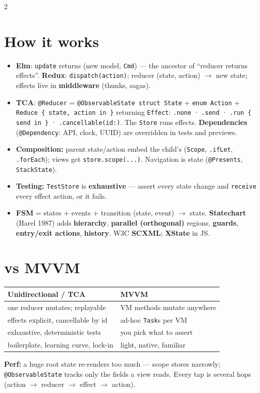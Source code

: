 \documentclass[8pt]{extarticle}
\begin{document}
\begin{multicols}{2}
\raggedright

\section{How it works}
{\raggedright
\begin{itemize}
  \item \textbf{Elm}: \texttt{update} returns (new model, \texttt{Cmd}) — the ancestor
        of ``reducer returns effects''. \textbf{Redux}: \texttt{dispatch(action)};
        reducer (state, action) $\to$ new state; effects live in \textbf{middleware}
        (thunks, sagas).
  \item \textbf{TCA}: \texttt{@Reducer} = \texttt{@ObservableState struct State} +
        \texttt{enum Action} + \texttt{Reduce \{ state, action in \}} returning
        \texttt{Effect}: \texttt{.none} · \texttt{.send} · \texttt{.run \{ send in \}} ·
        \texttt{.cancellable(id:)}. The \texttt{Store} runs effects.
        \textbf{Dependencies} (\texttt{@Dependency}: API, clock, UUID) are overridden in
        tests and previews.
  \item \textbf{Composition:} parent state/action embed the child's
        (\texttt{Scope}, \texttt{.ifLet}, \texttt{.forEach}); views get
        \texttt{store.scope(...)}. Navigation is state (\texttt{@Presents},
        \texttt{StackState}).
  \item \textbf{Testing:} \texttt{TestStore} is \textbf{exhaustive} — assert every state
        change and \texttt{receive} every effect action, or it fails.
  \item \textbf{FSM} = states + events + transition (state, event) $\to$ state.
        \textbf{Statechart} (Harel 1987) adds \textbf{hierarchy}, \textbf{parallel
        (orthogonal)} regions, \textbf{guards}, \textbf{entry/exit actions},
        \textbf{history}. W3C \textbf{SCXML}; \textbf{XState} in JS.
\end{itemize}\par}

\section{vs MVVM}
{\footnotesize
\begin{tabular}{@{}>{\raggedright\arraybackslash}p{36mm}>{\raggedright\arraybackslash}p{38mm}@{}}
\toprule
\textbf{Unidirectional / TCA} & \textbf{MVVM} \\
\midrule
one reducer mutates; replayable & VM methods mutate anywhere \\
effects explicit, cancellable by id & ad-hoc \texttt{Task}s per VM \\
exhaustive, deterministic tests & you pick what to assert \\
boilerplate, learning curve, lock-in & light, native, familiar \\
\bottomrule
\end{tabular}}
\textbf{Perf:} a huge root state re-renders too much — scope stores narrowly;
\texttt{@ObservableState} tracks only the fields a view reads. Every tap is several hops
(action $\to$ reducer $\to$ effect $\to$ action).


\end{multicols}
\end{document}
